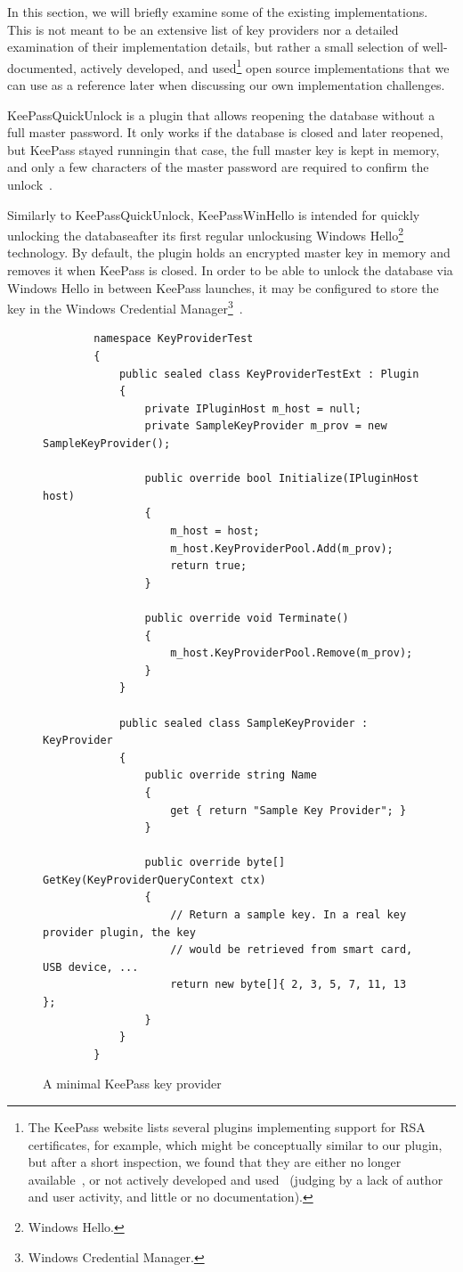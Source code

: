 In this section, we will briefly examine some of the existing implementations.
This is not meant to be an extensive list of key providers nor a detailed examination of their implementation details,
but rather a small selection of well-documented, actively developed, and used\footnote{
	The KeePass website lists several plugins implementing support for RSA certificates, for example,
	which might be conceptually similar to our plugin, but after a short inspection, we found that they are either no longer available~\cite{keepass:plugin:multi-cert, keepass:plugin:rsa-cert},
	or not actively developed and used~\cite{keepass:plugin:cert-key} (judging by a lack of author and user activity, and little or no documentation).
} open source implementations that we can use
as a reference later when discussing our own implementation challenges.

KeePassQuickUnlock is a plugin that allows reopening the database without a full master password. It only works if the database is closed
and later reopened, but KeePass stayed running\textemdash in that case, the full master key is kept in memory, and only
a few characters of the master password are required to confirm the unlock~\cite{keepass:plugin:quick-unlock}.

Similarly to KeePassQuickUnlock, KeePassWinHello is intended for quickly unlocking the database\textemdash after its first regular unlock\textemdash using \gls{Windows Hello}\footnote{\Glsdesc{Windows Hello}.}
technology. By default, the plugin holds an encrypted master key in memory and removes it when KeePass is closed.
In order to be able to unlock the database via Windows Hello in between KeePass launches, it
may be configured to store the key in the \gls{Windows Credential Manager}\footnote{\Glsdesc{Windows Credential Manager}.}~\cite{keepass:plugin:win-hello}.

\begin{figure}[H]
	\begin{verbatim}
		namespace KeyProviderTest
		{
			public sealed class KeyProviderTestExt : Plugin
			{
				private IPluginHost m_host = null;
				private SampleKeyProvider m_prov = new SampleKeyProvider();

				public override bool Initialize(IPluginHost host)
				{
					m_host = host;
					m_host.KeyProviderPool.Add(m_prov);
					return true;
				}

				public override void Terminate()
				{
					m_host.KeyProviderPool.Remove(m_prov);
				}
			}

			public sealed class SampleKeyProvider : KeyProvider
			{
				public override string Name
				{
					get { return "Sample Key Provider"; }
				}

				public override byte[] GetKey(KeyProviderQueryContext ctx)
				{
					// Return a sample key. In a real key provider plugin, the key
					// would be retrieved from smart card, USB device, ...
					return new byte[]{ 2, 3, 5, 7, 11, 13 };
				}
			}
		}
	\end{verbatim}

	\caption[A minimal KeePass key provider]
	{A minimal KeePass key provider~\protect\cite{keepass:key-provider-development}}
	\label{fig:minimal-key-provider}
\end{figure}

